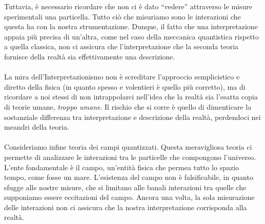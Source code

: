 \documentclass[]{article}
\begin{document}
	Tuttavia, è necessario ricordare che non ci è dato \enquote{vedere} attraverso le misure sperimentali una particella. Tutto ciò che misuriamo sono le interazioni che questa ha con la nostra strumentazione. Dunque, il fatto che una interpretazione appaia più precisa di un'altra, come nel caso della meccanica quantistica rispetto a quella classica, non ci assicura che l'interpretazione che la seconda teoria fornisce della realtà sia effettivamente una descrizione.    \\\\ 
	La mira dell'Interpretazionismo non è screditare l'approccio semplicistico e diretto della fisica (in quanto spesso e volentieri è quello più corretto), ma di ricordare a noi stessi di non intrappolarci nell'idea che la realtà sia l'esatta copia di teorie umane, \textit{troppo umane}. Il rischio che si corre è quello di dimenticare la sostanziale differenza tra interpretazione e descrizione della realtà, perdendoci nei meandri della teoria.\\
	\\
	Consideriamo infine teoria dei campi quantizzati. Questa meravigliosa teoria ci permette di analizzare le interazioni tra le particelle che compongono l'universo. L'ente fondamentale è il campo, un'entità fisica che permea tutto lo spazio tempo, come fosse un mare. L'esistenza del campo non è falsificabile, in quanto sfugge alle nostre misure, che si limitano alle banali interazioni tra quelle che supponiamo essere eccitazioni del campo. Ancora una volta, la sola misurazione delle interazioni non ci assicura che la nostra interpretazione corrisponda alla realtà. \\
\end{document}
